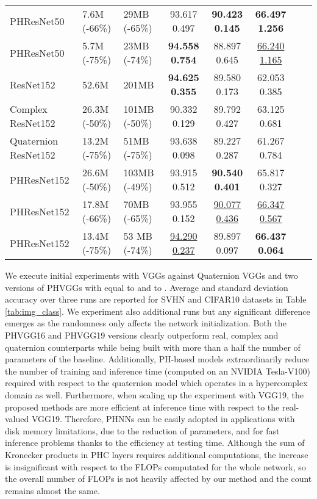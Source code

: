 \documentclass[lettersize,journal]{IEEEtran}
\begin{document}
\begin{table*}[t]
\begin{center}
\begin{tabular}{lllccccc}
PHResNet50    & 7.6M (-66\%) & 29MB (-65\%) &   93.617  0.497   &    \textbf{90.423  0.145}     &    \textbf{66.497  1.256}       \\
PHResNet50    & 5.7M (-75\%) & 23MB (-74\%) &  \textbf{94.558  0.754}   &    88.897  0.645     &     \underline{66.240  1.165}     \\
\hline
ResNet152            & 52.6M & 201MB &  \textbf{94.625  0.355}   &    89.580  0.173     &     62.053  0.385    \\
Complex ResNet152  & 26.3M (-50\%) & 101MB (-50\%) &   90.332  0.129   &    89.792  0.427     &    63.125  0.681    \\
Quaternion ResNet152 & 13.2M (-75\%) & 51MB (-75\%) &  93.638  0.098   &    89.227  0.287     &   61.267  0.784      \\
PHResNet152   & 26.6M (-50\%) & 103MB (-49\%) &  93.915  0.512   &    \textbf{90.540  0.401}     &      65.817  0.327    \\
PHResNet152   & 17.8M (-66\%) & 70MB (-65\%) &  93.955  0.152   &    \underline{90.077  0.436}     &     \underline{66.347  0.567}     \\
PHResNet152   & 13.4M (-75\%) & 53 MB (-74\%) &   \underline{94.290  0.237}   &     89.897  0.097    &     \textbf{66.437  0.064}     \\
\end{tabular}
\end{center}
\end{table*}

We execute initial experiments with VGGs against Quaternion VGGs and two versions of PHVGGs with  equal to  and to . Average and standard deviation accuracy over three runs are reported for SVHN and CIFAR10 datasets in Table \ref{tab:img_class}. We experiment also additional runs but any significant difference emerges as the randomness only affects the network initialization. Both the PHVGG16 and PHVGG19 versions clearly outperform real, complex and quaternion counterparts while being built with more than a half the number of parameters of the baseline. Additionally, PH-based models extraordinarily reduce the number of training and inference time (computed on an NVIDIA Tesla-V100) required with respect to the quaternion model which operates in a hypercomplex domain as well. Furthermore, when scaling up the experiment with VGG19, the proposed methods are more efficient at inference time with respect to the real-valued VGG19. Therefore, PHNNs can be easily adopted in applications with disk memory limitations, due to the reduction of parameters, and for fast inference problems thanks to the efficiency at testing time. Although the sum of Kronecker products in PHC layers requires additional computations, the increase is insignificant with respect to the FLOPs computated for the whole network, so the overall number of FLOPs is not heavily affected by our method and the count remains almost the same.
\end{document}
